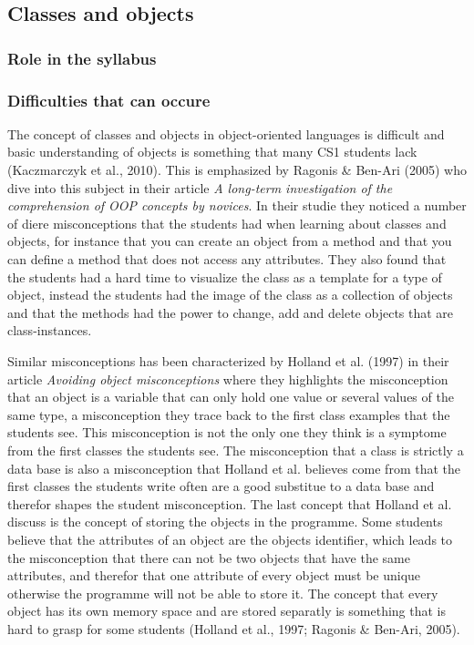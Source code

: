 \subsection{Classes and objects}

\subsubsection{Role in the syllabus}

\subsubsection{Difficulties that can occure}

The concept of classes and objects in object-oriented languages is difficult and basic understanding of objects is something that many CS1 students lack (Kaczmarczyk et al., 2010). This is emphasized by Ragonis \& Ben-Ari (2005) who dive into this subject in their article \emph{A long-term investigation of the comprehension of OOP concepts by novices}. In their studie they noticed a number of diere misconceptions that the students had when learning about classes and objects, for instance that you can create an object from a method and that you can define a method that does not access any attributes. They also found that the students had a hard time to visualize the class as a template for a type of object, instead the students had the image of the class as a collection of objects and that the methods had the power to change, add and delete objects that are class-instances. 

Similar misconceptions has been characterized by Holland et al. (1997) in their article \emph{Avoiding object misconceptions} where they highlights the misconception that an object is a variable that can only hold one value or several values of the same type, a misconception they trace back to the first class examples that the students see. This misconception is not the only one they think is a symptome from the first classes the students see. The misconception that a class is strictly a data base is also a misconception that Holland et al. believes come from that the first classes the students write often are a good substitue to a data base and therefor shapes the student misconception. The last concept that Holland et al. discuss is the concept of storing the objects in the programme. Some students believe that the attributes of an object are the objects identifier, which leads to the misconception that there can not be two objects that have the same attributes, and therefor that one attribute of every object must be unique otherwise the programme will not be able to store it. The concept that every object has its own memory space and are stored separatly is something that is hard to grasp for some students (Holland et al., 1997; Ragonis \& Ben-Ari, 2005). 

